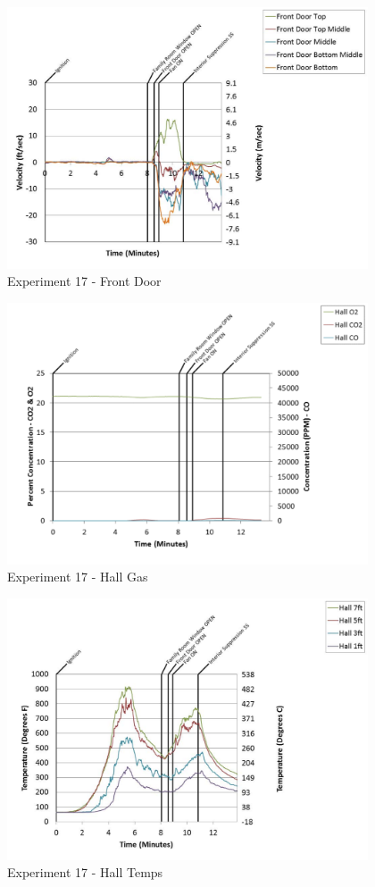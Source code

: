 \documentclass{article}
\begin{document}
\begin{appendices}
	\begin{figure}[h!]
		\centering
		\includegraphics[height=3.05in]{0_Images/Results_Charts/Exp_17_Charts/FrontDoor.pdf}
		\caption{Experiment 17 - Front Door}
	\end{figure}
 
	\clearpage

	\begin{figure}[h!]
		\centering
		\includegraphics[height=3.05in]{0_Images/Results_Charts/Exp_17_Charts/HallGas.pdf}
		\caption{Experiment 17 - Hall Gas}
	\end{figure}
 

	\begin{figure}[h!]
		\centering
		\includegraphics[height=3.05in]{0_Images/Results_Charts/Exp_17_Charts/HallTemps.pdf}
		\caption{Experiment 17 - Hall Temps}
	\end{figure}
 

\end{appendices}
\end{document}
